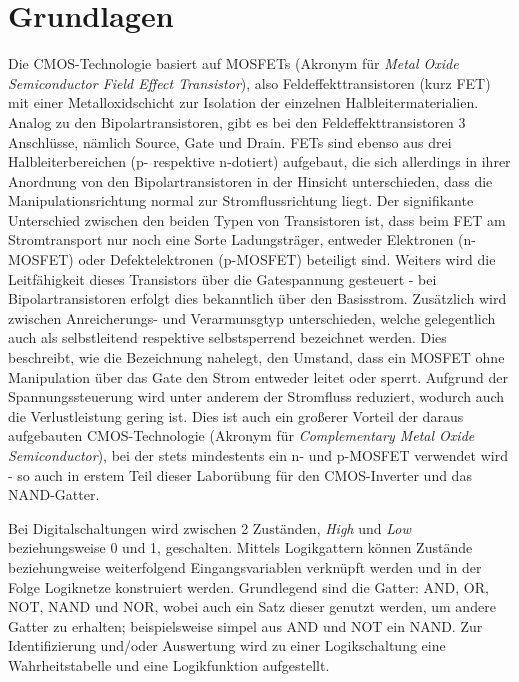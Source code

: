 \documentclass[12pt,english,ngerman]{scrartcl}
\begin{document}
\section{Grundlagen}\label{sec:Grundlagen}
%
Die CMOS-Technologie basiert auf MOSFETs (Akronym für \textit{Metal Oxide
Semiconductor Field Effect Transistor}), also Feldeffekttransistoren (kurz FET)
mit einer Metalloxidschicht zur Isolation der einzelnen Halbleitermaterialien.
Analog zu den Bipolartransistoren, gibt es bei den Feldeffekttransistoren 3
Anschlüsse, nämlich Source, Gate und Drain. 
FETs sind ebenso aus drei Halbleiterbereichen (p- respektive n-dotiert)
aufgebaut, die sich allerdings in ihrer Anordnung von den Bipolartransistoren
in der Hinsicht unterschieden, dass die Manipulationsrichtung normal zur
Stromflussrichtung liegt. Der signifikante Unterschied zwischen den beiden
Typen von Transistoren ist, dass beim FET am Stromtransport nur noch eine Sorte
Ladungsträger, entweder Elektronen (n-MOSFET) oder Defektelektronen (p-MOSFET)
beteiligt sind. Weiters wird die Leitfähigkeit dieses Transistors über die
Gatespannung gesteuert - bei Bipolartransistoren erfolgt dies bekanntlich über
den Basisstrom. Zusätzlich wird zwischen Anreicherungs- und Verarmunsgtyp
unterschieden, welche gelegentlich auch als selbstleitend respektive
selbstsperrend bezeichnet werden. Dies beschreibt, wie die Bezeichnung
nahelegt, den Umstand, dass ein MOSFET ohne Manipulation über das Gate den
Strom entweder leitet oder sperrt. Aufgrund der Spannungssteuerung wird unter
anderem der Stromfluss reduziert, wodurch auch die Verlustleistung gering ist.
Dies ist auch ein großerer Vorteil der daraus aufgebauten CMOS-Technologie
(Akronym für \textit{Complementary Metal Oxide Semiconductor}), bei der stets
mindestents ein n- und p-MOSFET verwendet wird - so auch in erstem Teil dieser
Laborübung für den CMOS-Inverter und das NAND-Gatter. 

Bei Digitalschaltungen wird zwischen 2 Zuständen, \textit{High} und
\textit{Low} beziehungsweise 0 und 1, geschalten. Mittels Logikgattern können
Zustände beziehungweise weiterfolgend Eingangsvariablen verknüpft werden und in
der Folge Logiknetze konstruiert werden. Grundlegend sind die Gatter: AND, OR,
NOT, NAND und NOR, wobei auch ein Satz dieser genutzt werden, um andere Gatter
zu erhalten; beispielsweise simpel aus AND und NOT ein NAND. Zur
Identifizierung und/oder Auswertung wird zu einer Logikschaltung eine
Wahrheitstabelle und eine Logikfunktion aufgestellt.
\end{document}
